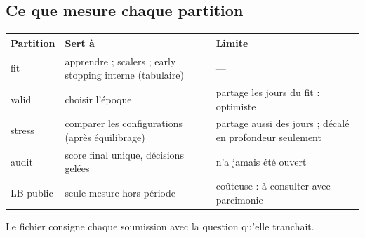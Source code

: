 \subsection{Ce que mesure chaque partition}
\begin{center}\small
\begin{tabular}{lll}
\toprule
Partition & Sert à & Limite\\
\midrule
fit & apprendre ; scalers ; early stopping interne (tabulaire) & —\\
valid & choisir l'époque & partage les jours du fit : optimiste\\
stress & comparer les configurations (après équilibrage) & partage aussi des jours ; décalé en profondeur seulement\\
audit & score final unique, décisions gelées & n'a jamais été ouvert\\
LB public & seule mesure hors période & coûteuse : à consulter avec parcimonie\\
\bottomrule
\end{tabular}
\end{center}
\noindent Le fichier  consigne chaque soumission avec la question qu'elle tranchait.
